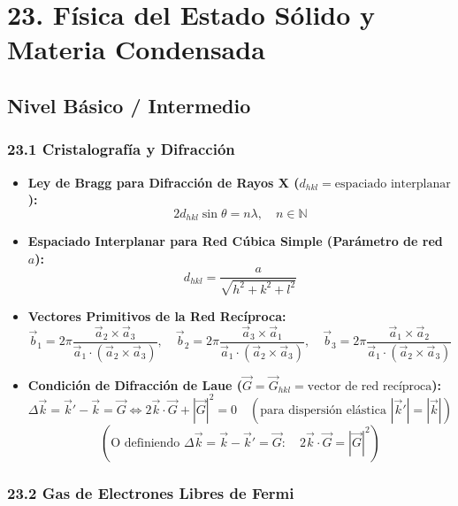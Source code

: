 \documentclass[11pt,a4paper]{article}
\begin{document}
\section*{23. Física del Estado Sólido y Materia Condensada}

\subsection*{Nivel Básico / Intermedio}

\subsubsection*{23.1 Cristalografía y Difracción}

\begin{itemize}
  \item \textbf{Ley de Bragg para Difracción de Rayos X ($d_{hkl} = \text{espaciado interplanar}$):}
  \[
    2 d_{hkl} \sin\theta = n \lambda, \quad n \in \mathbb{N}
  \]
  \item \textbf{Espaciado Interplanar para Red Cúbica Simple (Parámetro de red $a$):}
  \[
    d_{hkl} = \frac{a}{\sqrt{h^2 + k^2 + l^2}}
  \]
  \item \textbf{Vectores Primitivos de la Red Recíproca:}
  \[
    \vec{b}_1 = 2\pi \frac{\vec{a}_2 \times \vec{a}_3}{\vec{a}_1 \cdot (\vec{a}_2 \times \vec{a}_3)}, \quad \vec{b}_2 = 2\pi \frac{\vec{a}_3 \times \vec{a}_1}{\vec{a}_1 \cdot (\vec{a}_2 \times \vec{a}_3)}, \quad \vec{b}_3 = 2\pi \frac{\vec{a}_1 \times \vec{a}_2}{\vec{a}_1 \cdot (\vec{a}_2 \times \vec{a}_3)}
  \]
  \item \textbf{Condición de Difracción de Laue ($\vec{G} = \vec{G}_{hkl} = \text{vector de red recíproca}$):}
  \[
    \Delta\vec{k} = \vec{k}' - \vec{k} = \vec{G} \iff 2\vec{k} \cdot \vec{G} + |\vec{G}|^2 = 0 \quad (\text{para dispersión elástica } |\vec{k}'| = |\vec{k}|)
  \]
  \[
    \left( \text{O definiendo } \Delta\vec{k} = \vec{k} - \vec{k}' = \vec{G}: \quad 2\vec{k} \cdot \vec{G} = |\vec{G}|^2 \right)
  \]
\end{itemize}

\subsubsection*{23.2 Gas de Electrones Libres de Fermi}
\end{document}
